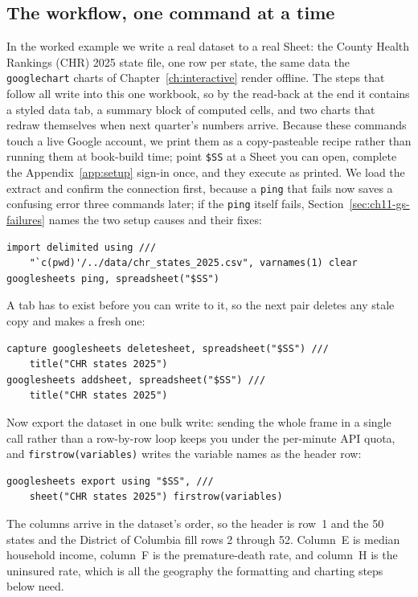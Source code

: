 \subsection{The workflow, one command at a time}
In the worked example we write a real dataset to a real Sheet: the County Health Rankings (CHR) 2025 state file, one row per state, the same data the \texttt{googlechart} charts of Chapter~\ref{ch:interactive} render offline. The steps that follow all write into this one workbook, so by the read-back at the end it contains a styled data tab, a summary block of computed cells, and two charts that redraw themselves when next quarter's numbers arrive. Because these commands touch a live Google account, we print them as a copy-pasteable recipe rather than running them at book-build time; point \texttt{\$SS} at a Sheet you can open, complete the Appendix~\ref{app:setup} sign-in once, and they execute as printed. We load the extract and confirm the connection first, because a \texttt{ping} that fails now saves a confusing error three commands later; if the \texttt{ping} itself fails, Section~\ref{sec:ch11-gs-failures} names the two setup causes and their fixes:
\par
{\footnotesize
\begin{verbatim}
import delimited using ///
    "`c(pwd)'/../data/chr_states_2025.csv", varnames(1) clear
googlesheets ping, spreadsheet("$SS")
\end{verbatim}
}
A tab has to exist before you can write to it, so the next pair deletes any stale copy and makes a fresh one:
\par
{\footnotesize
\begin{verbatim}
capture googlesheets deletesheet, spreadsheet("$SS") ///
    title("CHR states 2025")
googlesheets addsheet, spreadsheet("$SS") ///
    title("CHR states 2025")
\end{verbatim}
}
Now export the dataset in one bulk write: sending the whole frame in a single call rather than a row-by-row loop keeps you under the per-minute API quota, and \texttt{firstrow(variables)} writes the variable names as the header row:
\par
{\footnotesize
\begin{verbatim}
googlesheets export using "$SS", ///
    sheet("CHR states 2025") firstrow(variables)
\end{verbatim}
}
The columns arrive in the dataset's order, so the header is row~1 and the 50 states and the District of Columbia fill rows 2 through 52. Column~E is median household income, column~F is the premature-death rate, and column~H is the uninsured rate, which is all the geography the formatting and charting steps below need.

